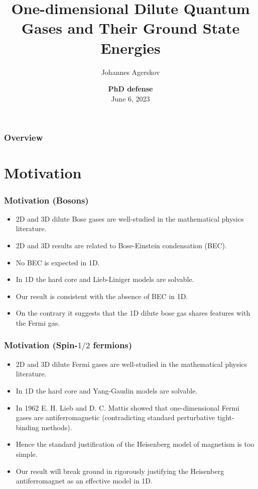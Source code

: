 \documentclass{beamer}[10]
\title{One-dimensional Dilute Quantum Gases and Their Ground State Energies}
\subtitle{}
\author{Johannes Agerskov}
\institute{Department of Mathematical Sciences \\ University of Copenhagen}
\date{\scriptsize{\textbf{PhD defense}}\\ \scriptsize{June 6, 2023}}
\begin{document}
\frame{\titlepage \vspace{-0.5cm}
}

\frame
{
\frametitle{Overview}
\tableofcontents%
}

\section{Motivation}

\begin{frame}
	\frametitle{Motivation (Bosons)}
	\begin{itemize}
		\item 2D and 3D dilute Bose gases are well-studied in the mathematical physics literature.
		\item 2D and 3D results are related to Bose-Einstein condensation (BEC).
		\item No BEC is expected in 1D.
		\item In 1D the hard core and Lieb-Liniger models are solvable.
		\item Our result is consistent with the absence of BEC in 1D.
		\item On the contrary it suggests that the 1D dilute bose gas shares features with the Fermi gas.
		
	\end{itemize}
	
\end{frame}

\begin{frame}
	\frametitle{Motivation (Spin-$1/2$ fermions)}
	\begin{itemize}
		\item 2D and 3D dilute Fermi gases are well-studied in the mathematical physics literature.
		\item In 1D the hard core and Yang-Gaudin models are solvable.
		\item  In 1962 E. H. Lieb and D. C. Mattis showed that one-dimensional Fermi gases are antiferromagnetic (contradicting standard perturbative tight-binding methods).
		\item Hence the standard justification of the Heisenberg model of magnetism is too simple.
		\item Our result will break ground in rigorously justifying the Heisenberg antiferromagnet as an effective model in 1D.
	\end{itemize}
	
\end{frame}
\end{document}

